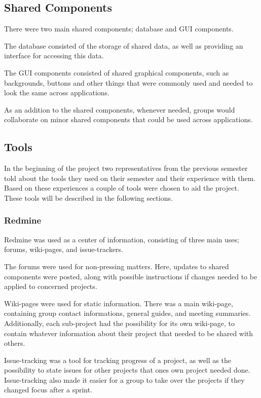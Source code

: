 \subsection{Shared Components}
There were two main shared components; database and GUI components.

The database consisted of the storage of shared data, as well as providing an interface for accessing this data.

The GUI components consisted of shared graphical components, such as backgrounds, buttons and other things that were commonly used and needed to look the same across applications.

As an addition to the shared components, whenever needed, groups would collaborate on minor shared components that could be used across applications.

\subsection{Tools}
In the beginning of the project two representatives from the previous semester told about the tools they used on their semester and their experience with them.
Based on these experiences a couple of tools were chosen to aid the project.
These tools will be described in the following sections.

\subsubsection{Redmine}
Redmine was used as a center of information, consisting of three main uses; forums, wiki-pages, and issue-trackers.

The forums were used for non-pressing matters.
Here, updates to shared components were posted, along with possible instructions if changes needed to be applied to concerned projects.

Wiki-pages were used for static information.
There was a main wiki-page, containing group contact informations, general guides, and meeting summaries.
Additionally, each sub-project had the possibility for its own wiki-page, to contain whatever information about their project that needed to be shared with others.

Issue-tracking was a tool for tracking progress of a project, as well as the possibility to state issues for other projects that ones own project needed done.
Issue-tracking also made it easier for a group to take over the projects if they changed focus after a sprint.

